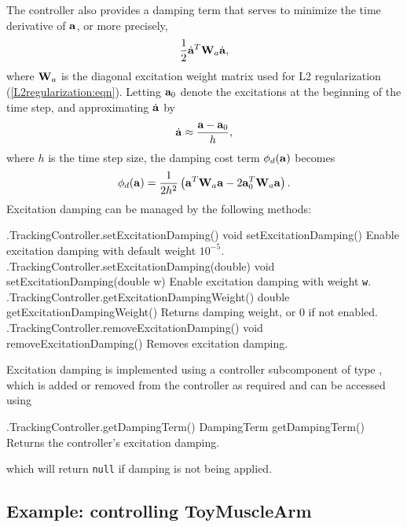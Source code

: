 The controller also provides a damping term that serves to minimize the time
derivative of ${\bf a}$, or more precisely,
%
\begin{equation*}
\frac{1}{2} \dot{{\bf a}}^T {\bf W}_a \dot{{\bf a}},
\end{equation*}
%
where ${\bf W}_a$ is the diagonal excitation weight matrix used for L2
regularization (\ref{L2regularization:eqn}). Letting ${\bf a}_0$ denote
the excitations at the beginning of the time step, and approximating
$\dot{{\bf a}}$ by
%
\begin{equation*}
\dot{{\bf a}} \approx \frac{{\bf a} - {\bf a}_0}{h},
\end{equation*}
%
where $h$ is the time step size, the damping cost term $\phi_d({\bf a})$
becomes
%
\begin{equation*}
\phi_d({\bf a}) = \frac{1}{2 h^2} \left( {\bf a}^T {\bf W}_a {\bf a} - 2 {\bf a}_0^T {\bf W}_a {\bf a} \right).
\end{equation*}
%
Excitation damping can be managed by the following methods:
%
\begin{methodtable}{0.6}{0.4}
\midline
%
\methodentry
{\inverse.TrackingController.setExcitationDamping()}%
{void setExcitationDamping()}%
{Enable excitation damping with default weight $10^{-5}$.}%
%
\methodentry
{\inverse.TrackingController.setExcitationDamping(double)}%
{void setExcitationDamping(double w)}%
{Enable excitation damping with weight {\tt w}.}%
%
\methodentry
{\inverse.TrackingController.getExcitationDampingWeight()}%
{double getExcitationDampingWeight()}%
{Returns damping weight, or 0 if not enabled.}%
%
\methodentry
{\inverse.TrackingController.removeExcitationDamping()}%
{void removeExcitationDamping()}%
{Removes excitation damping.}%
%
\midline
\end{methodtable}
%
Excitation damping is implemented using a controller subcomponent of type
, which
is added or removed from the controller as required and can be accessed using
%
\begin{methodtable}{0.6}{0.4}
\midline
%
\methodentry
{\inverse.TrackingController.getDampingTerm()}%
{DampingTerm getDampingTerm()}%
{Returns the controller's excitation damping.}%
%
\midline
\end{methodtable}
%
which will return {\tt null} if damping is not being applied.

\subsection{Example: controlling ToyMuscleArm}
\label{InverseMuscleArm:sec}

